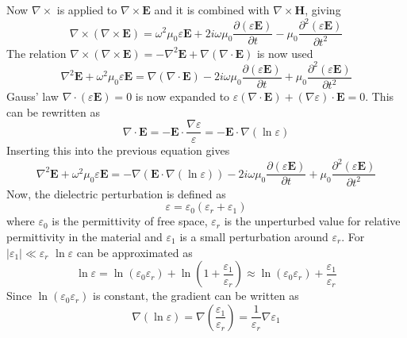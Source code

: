 \documentclass[10pt,a4paper]{eitExjobb}
\begin{document}
	Now $\nabla \times$ is applied to $\nabla \times \bm{E}$ and it is combined with $\nabla \times \bm{H}$, giving
	\begin{equation*}
	\nabla \times (\nabla \times \bm{E}) = \omega^2 \mu_0 \varepsilon \bm{E} + 2i\omega \mu_0 \frac{\partial (\varepsilon \bm{E})}{\partial t} - \mu_0 \frac{\partial^2 (\varepsilon \bm{E})}{\partial t^2}
	\end{equation*}
	The relation $\nabla \times (\nabla \times \bm{E}) = -\nabla^2\bm{E} + \nabla(\nabla \cdot \bm{E})$ is now used
	\begin{equation*}
	\nabla^2\bm{E} + \omega^2 \mu_0 \varepsilon \bm{E} = \nabla(\nabla \cdot \bm{E}) - 2i\omega \mu_0 \frac{\partial (\varepsilon \bm{E})}{\partial t} + \mu_0 \frac{\partial^2 (\varepsilon \bm{E})}{\partial t^2}
	\end{equation*}
	Gauss' law $\nabla \cdot (\varepsilon \bm{E}) = 0$ is now expanded to $\varepsilon(\nabla \cdot \bm{E}) + (\nabla \varepsilon) \cdot \bm{E} = 0$. This can be rewritten as
	\begin{equation*}
	\nabla \cdot \bm{E} = -\bm{E} \cdot \frac{\nabla \varepsilon}{\varepsilon} = -\bm{E} \cdot \nabla (\ln{\varepsilon})
	\end{equation*}
	Inserting this into the previous equation gives
	\begin{equation*}
	\nabla^2\bm{E} + \omega^2 \mu_0 \varepsilon \bm{E} = -\nabla(\bm{E} \cdot \nabla (\ln{\varepsilon})) - 2i\omega \mu_0 \frac{\partial (\varepsilon \bm{E})}{\partial t} + \mu_0 \frac{\partial^2 (\varepsilon \bm{E})}{\partial t^2}
	\end{equation*}
	Now, the dielectric perturbation is defined as
	\begin{equation*}
	\varepsilon = \varepsilon_0(\varepsilon_r + \varepsilon_1)
	\end{equation*}
	where $\varepsilon_0$ is the permittivity of free space, $\varepsilon_r$ is the unperturbed value for relative permittivity in the material and $\varepsilon_1$ is a small perturbation around $\varepsilon_r$. For $|\varepsilon_1| \ll \varepsilon_r$ $\ln{\varepsilon}$ can be approximated as
	\begin{equation*}
	\ln{\varepsilon} = \ln(\varepsilon_0 \varepsilon_r) + \ln(1 + \frac{\varepsilon_1}{\varepsilon_r}) \approx \ln(\varepsilon_0 \varepsilon_r) + \frac{\varepsilon_1}{\varepsilon_r}
	\end{equation*}
	Since $\ln(\varepsilon_0 \varepsilon_r)$ is constant, the gradient can be written as
	\begin{equation*}
	\nabla(\ln{\varepsilon}) = \nabla \left( \frac{\varepsilon_1}{\varepsilon_r} \right) = \frac{1}{\varepsilon_r} \nabla \varepsilon_1
	\end{equation*}
\end{document}
